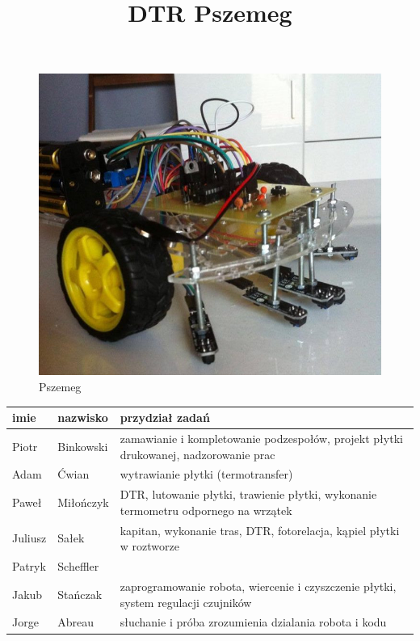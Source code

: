 \documentclass[a4paper,11pt]{article}
\def\SCALE{0.6}
\begin{document}
\title{DTR Pszemeg}

\maketitle

\begin{center}
\begin{figure}[H]
	\centering
	\includegraphics[width=\SCALE
	\paperwidth]{Pszemeg}
	\caption{Pszemeg}
\end{figure}

\begin{tabularx}{\textwidth}{|l|l|X|}
\hline
imie		& nazwisko		& przydział zadań \\ \hline
Piotr	& Binkowski		& zamawianie i kompletowanie podzespołów, projekt płytki drukowanej, nadzorowanie prac			\\
Adam		& Ćwian			& wytrawianie płytki (termotransfer)			\\
Paweł	& Miłończyk		& DTR, lutowanie płytki, trawienie płytki, wykonanie termometru odpornego na wrzątek			\\
Juliusz & Sałek			& kapitan, wykonanie tras, DTR, fotorelacja, kąpiel płytki w roztworze			\\
Patryk	& Scheffler		&			\\
Jakub	& Stańczak		& zaprogramowanie robota, wiercenie i czyszczenie płytki, system regulacji czujników			\\
Jorge	& Abreau			& słuchanie i próba zrozumienia dzialania robota i kodu	\\ \hline
\end{tabularx}
\end{center}
\end{document}
